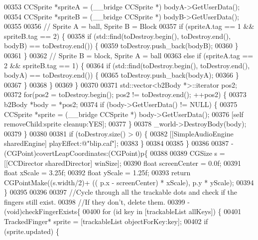 \begin{DoxyCode}
{{{{{{00353             CCSprite *spriteA = (\_\_bridge CCSprite *) bodyA->GetUserData();
00354             CCSprite *spriteB = (\_\_bridge CCSprite *) bodyB->GetUserData();
00355             
00356             \textcolor{comment}{// Sprite A = ball, Sprite B = Block}
00357             \textcolor{keywordflow}{if} (spriteA.tag == 1 && spriteB.tag == 2) \{
00358                 \textcolor{keywordflow}{if} (std::find(toDestroy.begin(), toDestroy.end(), bodyB) == toDestroy.end()) \{
00359                     toDestroy.push\_back(bodyB);
00360                 \}
00361             \}
00362             \textcolor{comment}{// Sprite B = block, Sprite A = ball}
00363             \textcolor{keywordflow}{else} \textcolor{keywordflow}{if} (spriteA.tag == 2 && spriteB.tag == 1) \{
00364                 \textcolor{keywordflow}{if} (std::find(toDestroy.begin(), toDestroy.end(), bodyA) == toDestroy.end()) \{
00365                     toDestroy.push\_back(bodyA);
00366                 \}
00367             \}        
00368         \}                 
00369     \}
00370 
00371     std::vector<b2Body *>::iterator pos2;
00372     \textcolor{keywordflow}{for}(pos2 = toDestroy.begin(); pos2 != toDestroy.end(); ++pos2) \{
00373         b2Body *body = *pos2;     
00374         \textcolor{keywordflow}{if} (body->GetUserData() != NULL) \{
00375             CCSprite *sprite = (\_\_bridge CCSprite *) body->GetUserData();
00376             [\textcolor{keyword}{self} removeChild:sprite cleanup:YES];
00377         \}
00378         \_world->DestroyBody(body);
00379     \}
00380     
00381     \textcolor{keywordflow}{if} (toDestroy.size() > 0) \{
00382         [[SimpleAudioEngine sharedEngine] playEffect:@"blip.caf"];   
00383     \}
00384 
00385 \}
00386 
00387 - (CGPoint)covertLeapCoordinates:(CGPoint)p\{
00388     
00389     CGSize s = [[CCDirector sharedDirector] winSize];
00390     \textcolor{keywordtype}{float} screenCenter = 0.0f;
00391     \textcolor{keywordtype}{float} xScale = 3.25f;
00392     \textcolor{keywordtype}{float} yScale = 1.25f;
00393     \textcolor{keywordflow}{return} CGPointMake((s.width/2)+ (( p.x - screenCenter) * xScale), p.y * yScale);
00394 \}
00395 
00396 
00397 \textcolor{comment}{//Cycle through all the trackable dots and check if the fingers still exist.}
00398 \textcolor{comment}{//If they don't, delete them.}
00399 - (void)checkFingerExists\{
00400     \textcolor{keywordflow}{for} (\textcolor{keywordtype}{id} key in [trackableList allKeys]) \{
00401         TrackedFinger* sprite = [trackableList objectForKey:key];
00402         \textcolor{keywordflow}{if} (sprite.updated) \{
}}}}}}
\end{DoxyCode}
